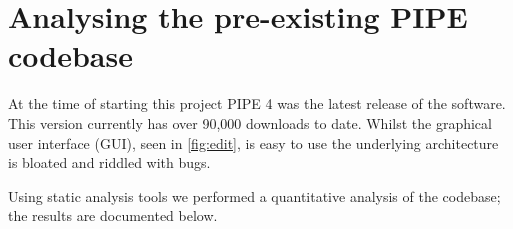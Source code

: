 \section{Analysing the pre-existing PIPE codebase}
At the time of starting this project PIPE 4 was the latest release of the software. This version currently has over 90,000 downloads to date. Whilst the graphical user interface (GUI), seen in \cref{fig:edit}, is easy to use the underlying architecture is bloated and riddled with bugs.

Using static analysis tools we performed a quantitative analysis of the codebase; the  results are documented below.




